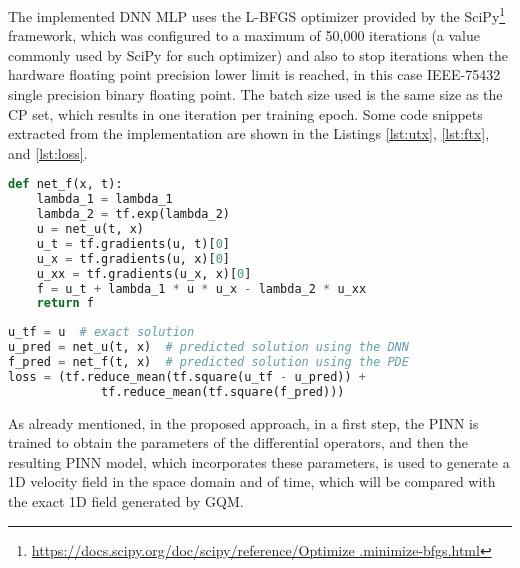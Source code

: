The implemented DNN MLP uses the L-BFGS optimizer provided by the SciPy\footnote{\url{https://docs.scipy.org/doc/scipy/reference/Optimize .minimize-bfgs.html}} framework, which was configured to a maximum of 50,000 iterations (a value commonly used by SciPy for such optimizer) and also to stop iterations when the hardware floating point precision lower limit is reached, in this case IEEE-75432 single precision binary floating point. The batch size used is the same size as the CP set, which results in one iteration per training epoch. Some code snippets extracted from the implementation are shown in the Listings \ref{lst:utx}, \ref{lst:ftx}, and \ref{lst:loss}.

\begin{minipage}[htb]{\columnwidth}
\begin{lstlisting}[language=Python, label=lst:ftx, 
caption={Snippet of Python code that implements $f(t,x)$, seen in the listing as \texttt{net\_f(x, t)}. The \texttt{net\_u} function is shown in \autoref{lst:utx}. The \texttt{tf.gradients} is part of the TensorFlow framework and is used in the gradient-based training and optimization algorithm.}]
def net_f(x, t):
	lambda_1 = lambda_1
	lambda_2 = tf.exp(lambda_2)
	u = net_u(t, x)
	u_t = tf.gradients(u, t)[0]
	u_x = tf.gradients(u, x)[0]
	u_xx = tf.gradients(u_x, x)[0]
	f = u_t + lambda_1 * u * u_x - lambda_2 * u_xx
	return f
\end{lstlisting}
\end{minipage}%

\begin{minipage}[htb]{\columnwidth}
\begin{lstlisting}[language=Python, label=lst:loss, 
caption={Snippet of Python code that implements the loss function (\texttt{loss}). The \texttt{u} is the exact solution. The \texttt{net\_u} function is shown in \autoref{lst:utx}. The \texttt{net\_f} function is shown in \autoref{lst:ftx}.}]
u_tf = u  # exact solution
u_pred = net_u(t, x)  # predicted solution using the DNN
f_pred = net_f(t, x)  # predicted solution using the PDE
loss = (tf.reduce_mean(tf.square(u_tf - u_pred)) +
             tf.reduce_mean(tf.square(f_pred)))
\end{lstlisting}
\end{minipage}%

As already mentioned, in the proposed approach, in a first step, the PINN is trained to obtain the parameters of the differential operators, and then the resulting PINN model, which incorporates these parameters, is used to generate a 1D velocity field in the space domain and of time, which will be compared with the exact 1D field generated by GQM.

